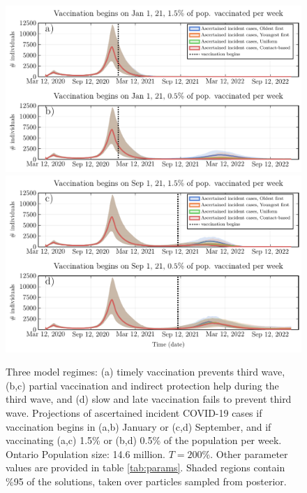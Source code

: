 \begin{figure}
\includegraphics[width=\textwidth]{chapter_1/main_text_ts_1.pdf}
\includegraphics[width=\textwidth]{chapter_1/main_text_ts_2.pdf}
\caption[Three model regimes: (a) timely vaccination prevents third wave, (b,c) partial vaccination and indirect protection help during the third wave, and (d) slow and late vaccination fails to prevent third wave.]{Three model regimes: (a) timely vaccination prevents third wave, (b,c) partial vaccination and indirect protection help during the third wave, and (d) slow and late vaccination fails to prevent third wave.  Projections of ascertained incident COVID-19 cases if vaccination begins in (a,b) January or (c,d) September, and if vaccinating (a,c) 1.5\% or (b,d) 0.5\% of the population per week. Ontario Population size: 14.6 million. $T = 200$\%. Other parameter values are provided in table \ref{tab:params}. Shaded regions contain \%95 of the solutions, taken over particles sampled from posterior.}
\label{fig3}
\end{figure}


